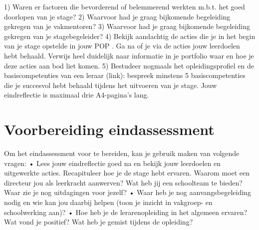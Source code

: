 \documentclass[a4paper,12pt,twoside]{article}%
\begin{document}
	1) Waren er factoren die bevorderend of belemmerend werkten m.b.t. het goed doorlopen van je stage? 
	2) Waarvoor had je graag bijkomende begeleiding gekregen van je vakmentoren? 
	3) Waarvoor had je graag bijkomende begeleiding gekregen van je stagebegeleider? 
	4) Bekijk aandachtig de acties die je in het begin van je stage opstelde in jouw POP . Ga na of je via de acties jouw leerdoelen hebt behaald. Verwijs heel duidelijk naar informatie in je portfolio waar en hoe je deze acties aan bod liet komen. 
	5)  Bestudeer nogmaals het opleidingsprofiel en de basiscompetenties van een leraar (link):  bespreek minstens 5 basiscompetenties die je succesvol hebt behaald tijdens het uitvoeren van je stage. 
	Jouw eindreflectie is maximaal drie A4-pagina’s lang. 
	
	
	
	\section{Voorbereiding eindassessment}
	
	Om het eindassessment voor te bereiden, kan je gebruik maken van volgende vragen:
	• Lees jouw eindreflectie goed na en bekijk jouw leerdoelen en uitgewerkte acties. Recapituleer hoe je de stage hebt ervaren. Waarom moet een directeur jou als leerkracht aanwerven? Wat heb jij een schoolteam te bieden? Waar zie je nog uitdagingen voor jezelf? 
	• Waar heb je nog aanvangsbegeleiding nodig en wie kan jou daarbij helpen (toon je inzicht in vakgroep- en schoolwerking aan)?
	• Hoe heb je de lerarenopleiding in het algemeen ervaren? Wat vond je positief? Wat heb je gemist tijdens de opleiding? 
	
	
	
	
	
	
\end{document}
